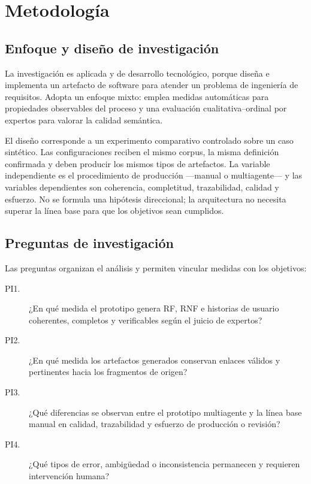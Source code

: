 \chapter{Metodología}
\label{cap:metodologia}

\section{Enfoque y diseño de investigación}

La investigación es aplicada y de desarrollo tecnológico, porque diseña e implementa un artefacto de software para atender un problema de ingeniería de requisitos. Adopta un enfoque mixto: emplea medidas automáticas para propiedades observables del proceso y una evaluación cualitativa--ordinal por expertos para valorar la calidad semántica.

El diseño corresponde a un experimento comparativo controlado sobre un caso sintético. Las configuraciones reciben el mismo corpus, la misma definición confirmada y deben producir los mismos tipos de artefactos. La variable independiente es el procedimiento de producción ---manual o multiagente--- y las variables dependientes son coherencia, completitud, trazabilidad, calidad y esfuerzo. No se formula una hipótesis direccional; la arquitectura no necesita superar la línea base para que los objetivos sean cumplidos.

\section{Preguntas de investigación}

Las preguntas organizan el análisis y permiten vincular medidas con los objetivos:

\begin{description}
  \item[PI1.] ¿En qué medida el prototipo genera RF, RNF e historias de usuario coherentes, completos y verificables según el juicio de expertos?
  \item[PI2.] ¿En qué medida los artefactos generados conservan enlaces válidos y pertinentes hacia los fragmentos de origen?
  \item[PI3.] ¿Qué diferencias se observan entre el prototipo multiagente y la línea base manual en calidad, trazabilidad y esfuerzo de producción o revisión?
  \item[PI4.] ¿Qué tipos de error, ambigüedad o inconsistencia permanecen y requieren intervención humana?
\end{description}

